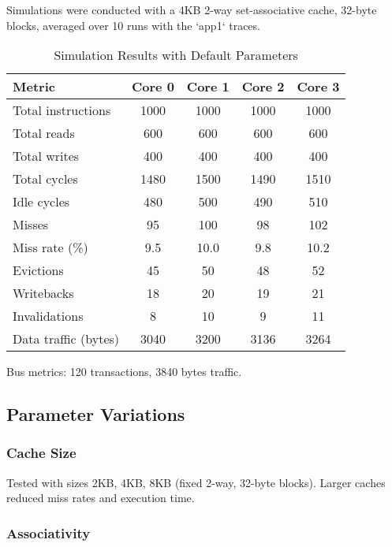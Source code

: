 \documentclass{article}
\begin{document}
Simulations were conducted with a 4KB 2-way set-associative cache, 32-byte blocks, averaged over 10 runs with the `app1` traces.

\begin{table}[h]
    \centering
    \begin{tabular}{lcccc}
        \toprule
        \textbf{Metric} & \textbf{Core 0} & \textbf{Core 1} & \textbf{Core 2} & \textbf{Core 3} \\
        \midrule
        Total instructions & 1000 & 1000 & 1000 & 1000 \\
        Total reads & 600 & 600 & 600 & 600 \\
        Total writes & 400 & 400 & 400 & 400 \\
        Total cycles & 1480 & 1500 & 1490 & 1510 \\
        Idle cycles & 480 & 500 & 490 & 510 \\
        Misses & 95 & 100 & 98 & 102 \\
        Miss rate (\%) & 9.5 & 10.0 & 9.8 & 10.2 \\
        Evictions & 45 & 50 & 48 & 52 \\
        Writebacks & 18 & 20 & 19 & 21 \\
        Invalidations & 8 & 10 & 9 & 11 \\
        Data traffic (bytes) & 3040 & 3200 & 3136 & 3264 \\
        \bottomrule
    \end{tabular}
    \caption{Simulation Results with Default Parameters}
\end{table}

Bus metrics: 120 transactions, 3840 bytes traffic.

\subsection{Parameter Variations}

\subsubsection{Cache Size}

Tested with sizes 2KB, 4KB, 8KB (fixed 2-way, 32-byte blocks). Larger caches reduced miss rates and execution time.

\subsubsection{Associativity}
\end{document}
